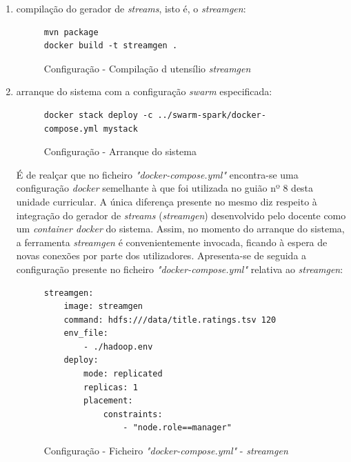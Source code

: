 \documentclass[a4paper]{report}
\begin{document}
{\begin{enumerate}[label=\textbf{\arabic*.}]
                \item compilação do gerador de \textit{streams}, isto é, o \textit{streamgen}:
                \begin{figure}[H]
                    \centering
                    \begin{verbatim}
mvn package
docker build -t streamgen .
                    \end{verbatim}
                    \vspace{-5mm}
                    \caption{Configuração - Compilação d utensílio \textit{streamgen}}
                    \label{fig:9}
                \end{figure}

                \item arranque do sistema com a configuração \textit{swarm} especificada:
                \begin{figure}[H]
                    \centering
                    \begin{verbatim}
docker stack deploy -c ../swarm-spark/docker-compose.yml mystack
                    \end{verbatim}
                    \vspace{-5mm}
                    \caption{Configuração - Arranque do sistema}
                    \label{fig:10}
                \end{figure}

                É de realçar que no ficheiro \textit{"docker-compose.yml"} encontra-se uma configuração \textit{docker} semelhante à que foi utilizada no guião nº 8 desta unidade curricular.
                A única diferença presente no mesmo diz respeito à integração do gerador de \textit{streams} (\textit{streamgen}) desenvolvido pelo docente como um \textit{container docker} do sistema.
                Assim, no momento do arranque do sistema, a ferramenta \textit{streamgen} é convenientemente invocada, ficando à espera de novas conexões por parte dos utilizadores.
                Apresenta-se de seguida a configuração presente no ficheiro \textit{"docker-compose.yml"} relativa ao \textit{streamgen}:

                \begin{figure}[H]
                    \centering
                    \begin{verbatim}
streamgen:
    image: streamgen
    command: hdfs:///data/title.ratings.tsv 120
    env_file:
        - ./hadoop.env
    deploy:
        mode: replicated
        replicas: 1
        placement:
            constraints:
                - "node.role==manager"
                    \end{verbatim}
                    \vspace{-5mm}
                    \caption{Configuração - Ficheiro \textit{"docker-compose.yml"} - \textit{streamgen}}
                    \label{fig:11}
                \end{figure}


\end{enumerate}}
\end{document}
